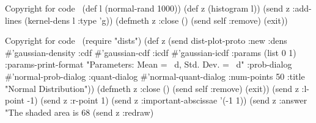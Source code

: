 \nwenddocs{}\endmoddef
\LA{}Copyright for code~{\nwtagstyle{}}\RA{}
(def l (normal-rand 1000))
(def z (histogram l))
(send z :add-lines (kernel-dens l :type 'g))
(defmeth z :close () (send self :remove) (exit))
\eatline
{}\nwendcode{}\nwdocspar

\nwenddocs{}\endmoddef
\LA{}Copyright for code~{\nwtagstyle{}}\RA{}
(require "dists")
(def z 
  (send dist-plot-proto :new
        :dens #'gaussian-density
        :cdf #'gaussian-cdf
        :icdf #'gaussian-icdf
        :params (list 0 1)
        :params-print-format "Parameters: Mean = ~d, Std. Dev. = ~d"
        :prob-dialog #'normal-prob-dialog
        :quant-dialog #'normal-quant-dialog
        :num-points 50
        :title "Normal Distribution"))
(defmeth z :close () (send self :remove) (exit))
(send z :l-point -1)
(send z :r-point 1)
(send z :important-abscissae '(-1 1))
(send z :answer "The shaded area is 68%
(send z :redraw)
\eatline
